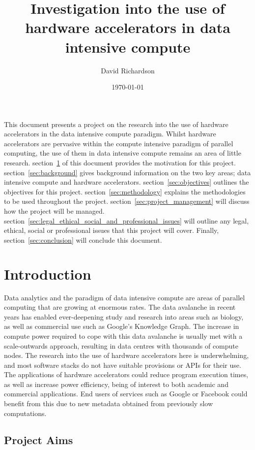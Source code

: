 \documentclass[12pt,a4paper]{article}
\title{Investigation into the use of hardware accelerators in data intensive compute}
\author{David Richardson}
\date{\today}
\begin{document}
	\maketitle

	This document presents a project on the research into the use of hardware accelerators in the data intensive compute paradigm. Whilst hardware accelerators are pervasive within the compute intensive paradigm of parallel computing, the use of them in data intensive compute remains an area of little research. section~\ref{sec:introduction} of this document provides the motivation for this project. section~\ref{sec:background} gives background information on the two key areas; data intensive compute and hardware accelerators. section~\ref{sec:objectives} outlines the objectives for this project. section~\ref{sec:methodology} explains the methodologies to be used throughout the project. section~\ref{sec:project_management} will discuss how the project will be managed. section~\ref{sec:legal_ethical_social_and_professional_issues} will outline any legal, ethical, social or professional issues that this project will cover. Finally, section~\ref{sec:conclusion} will conclude this document.

	\section{Introduction} %
	\label{sec:introduction}

		Data analytics and the paradigm of data intensive compute are areas of parallel computing that are growing at enormous rates. The data avalanche in recent years has enabled ever-deepening study and research into areas such as biology, as well as commercial use such as Google's Knowledge Graph. The increase in compute power required to cope with this data avalanche is usually met with a scale-outwards approach, resulting in data centres with thousands of compute nodes. The research into the use of hardware accelerators here is underwhelming, and most software stacks do not have suitable provisions or APIs for their use. The applications of hardware accelerators could reduce program execution times, as well as increase power efficiency, being of interest to both academic and commercial applications. End users of services such as Google or Facebook could benefit from this due to new metadata obtained from previously slow computations.

		\subsection{Project Aims} %
		\label{sub:project_aims}
\end{document}
